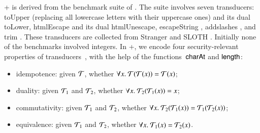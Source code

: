 \smallskip
\noindent \transducerbench+
is derived from the {\transducerbench} benchmark suite of {\ostrich}
\cite{CHL+19}.  The {\transducerbench} suite involves seven
transducers: toUpper (replacing all lowercase letters with their
uppercase ones) and its dual toLower, htmlEscape \cite{htmlEscape} and
its dual htmlUnescape, escapeString \cite{escapeString}, addslashes
\cite{addslashes}, and trim \cite{trim}. These transducers are
collected from Stranger \cite{YABI14} and SLOTH
\cite{HJLRV18}. Initially none of the benchmarks involved integers. In
{\transducerbench+}, we encode four security-relevant properties of
transducers~\cite{BEK}, with the help of the functions~$\mathsf{charAt}$ and
$\mathsf{length}$:
\begin{itemize}
\item idempotence: given $\mathcal{T}$, whether
  $\forall x.\ \mathcal{T}(\mathcal{T}(x)) = \mathcal{T}(x)$;
\item duality: given $\mathcal{T}_1$ and
  $\mathcal{T}_2$, whether $\forall x.\ \mathcal{T}_2(\mathcal{T}_1(x)) = x$;
\item commutativity: given $\mathcal{T}_1$ and $\mathcal{T}_2$, whether
  $\forall x.\ \mathcal{T}_2(\mathcal{T}_1(x)) = \mathcal{T}_1(\mathcal{T}_2(x))$;
\item equivalence: given $\mathcal{T}_1$ and $\mathcal{T}_2$, whether
  $\forall x.\ \mathcal{T}_1(x) = \mathcal{T}_2(x)$.
\end{itemize}

